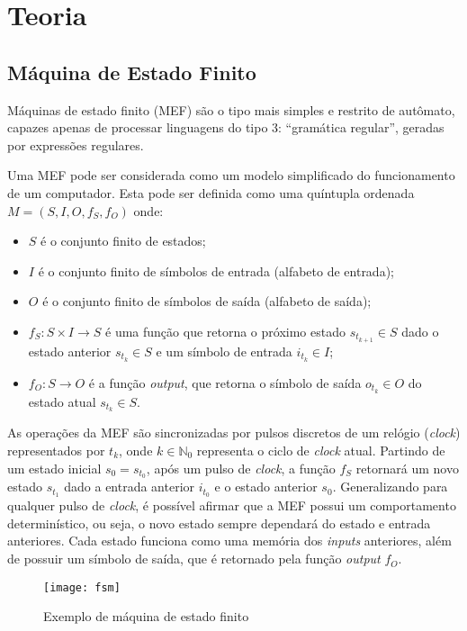 \section{Teoria}

\subsection{Máquina de Estado Finito}

Máquinas de estado finito (MEF) são o tipo mais simples e restrito de autômato,
capazes apenas de processar linguagens do tipo 3: ``gramática regular'',
geradas por expressões regulares.

Uma MEF pode ser considerada como um modelo simplificado do funcionamento de um
computador. Esta pode ser definida como uma quíntupla ordenada $M = (S, I, O,
f_S, f_O)$ onde:
\begin{itemize}
    \item $S$ é o conjunto finito de estados;
    \item $I$ é o conjunto finito de símbolos de entrada (alfabeto de entrada);
    \item $O$ é o conjunto finito de símbolos de saída (alfabeto de saída);
    \item $f_S: S \times I \rightarrow S$ é uma função que retorna o próximo
          estado $s_{t_{k+1}} \in S$ dado o estado anterior $s_{t_k} \in S$ e
          um símbolo de entrada $i_{t_k} \in I$;
    \item $f_O: S \rightarrow O$ é a função \textit{output}, que retorna o
          símbolo de saída $o_{t_k} \in O$ do estado atual $s_{t_k} \in S$.
\end{itemize}

As operações da MEF são sincronizadas por pulsos discretos de um relógio
(\textit{clock}) representados por $t_k$, onde $k \in \mathbb{N}_0$ representa o
ciclo de \textit{clock} atual. Partindo de um estado inicial $s_0 = s_{t_0}$,
após um pulso de \textit{clock}, a função $f_S$ retornará um novo estado
$s_{t_1}$ dado a entrada anterior $i_{t_0}$ e o estado anterior $s_0$.
Generalizando para qualquer pulso de \textit{clock}, é possível afirmar que a
MEF possui um comportamento determinístico, ou seja, o novo estado sempre
dependará do estado e entrada anteriores. Cada estado funciona como uma memória
dos \textit{inputs} anteriores, além de possuir um símbolo de saída, que é
retornado pela função \textit{output} $f_O$.

\begin{figure}[H]
    \centering
    \texttt{[image: fsm]}
    \label{fsm}
    \caption{Exemplo de máquina de estado finito}
\end{figure}

